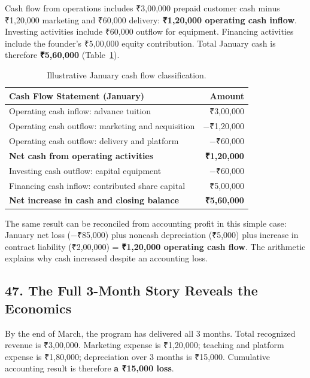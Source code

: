 Cash flow from operations includes ₹3,00,000 prepaid customer cash minus ₹1,20,000 marketing and ₹60,000 delivery: \textbf{₹1,20,000 operating cash inflow}. Investing activities include ₹60,000 outflow for equipment. Financing activities include the founder's ₹5,00,000 equity contribution. Total January cash is therefore \textbf{₹5,60,000} (Table~\ref{tab:january-cash-flow}).

\begin{table}[htbp]
\centering
\small
\begin{tabularx}{\columnwidth}{Xr}
\toprule
\textbf{Cash Flow Statement (January)} & \textbf{Amount} \\
\midrule
Operating cash inflow: advance tuition & ₹3,00,000 \\
Operating cash outflow: marketing and acquisition & $-$₹1,20,000 \\
Operating cash outflow: delivery and platform & $-$₹60,000 \\
\midrule
\textbf{Net cash from operating activities} & \textbf{₹1,20,000} \\
Investing cash outflow: capital equipment & $-$₹60,000 \\
Financing cash inflow: contributed share capital & ₹5,00,000 \\
\midrule
\textbf{Net increase in cash and closing balance} & \textbf{₹5,60,000} \\
\bottomrule
\end{tabularx}
\caption{Illustrative January cash flow classification.}
\label{tab:january-cash-flow}
\end{table}

The same result can be reconciled from accounting profit in this simple case: January net loss ($-$₹85,000) plus noncash depreciation (₹5,000) plus increase in contract liability (₹2,00,000) = \textbf{₹1,20,000 operating cash flow}. The arithmetic explains why cash increased despite an accounting loss.

\subsection*{47. The Full 3-Month Story Reveals the Economics}

By the end of March, the program has delivered all 3 months. Total recognized revenue is ₹3,00,000. Marketing expense is ₹1,20,000; teaching and platform expense is ₹1,80,000; depreciation over 3 months is ₹15,000. Cumulative accounting result is therefore \textbf{a ₹15,000 loss}.

